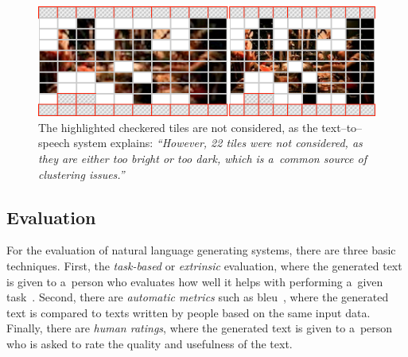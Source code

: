 \begin{figure}[t!]
  \centering
  \includegraphics[width=0.75\linewidth]{./tile-highlight.png}
  \caption{The highlighted checkered tiles are not considered, as the text--to--speech system explains: \textit{``However, 22 tiles were not considered, as they are either too bright or too dark, which is a~common source of clustering issues.''}}
  \label{fig:tile-highlight}
\end{figure}

\subsection{Evaluation}
\label{sec:evaluation}

For the evaluation of natural language generating systems,
there are three basic techniques.
First, the \emph{task-based} or \emph{extrinsic} evaluation,
where the generated text is given to a~person who evaluates
how well it helps with performing a~given task~\cite{portet2009nlg}.
Second, there are \emph{automatic metrics}
such as {\sc bleu}~\cite{papineni2002bleu}, where the generated text
is compared to texts written by people based on the same input data.
Finally, there are \emph{human ratings}, where the generated text
is given to a~person who is asked to rate the quality and usefulness of the text.

